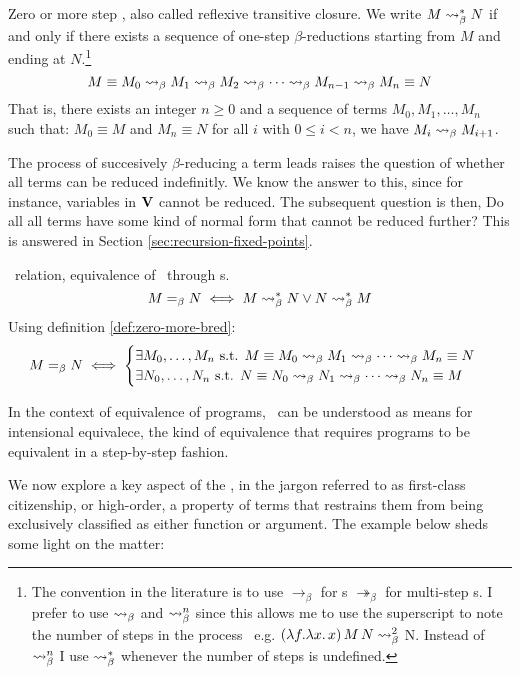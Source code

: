 \documentclass[12pt]{book}
\newcommand{\myref}[1]{\textcolor{refcolor}{\hyperref[#1]{\ref*{#1}}}}
\newcommand{\step}{\curly} %
\begin{document}
\begin{definition} Zero or more step \bred, also called reflexive transitive closure. We write $M \step^* N$ if and only if there exists a sequence of one-step $\beta$-reductions starting from $M$ and ending at $N$.\footnote{The convention in the literature is to use $\rightarrow_\beta$ for \bred s $\twoheadrightarrow_\beta$ for multi-step \bred s. I prefer to use $\mathrel{\leadsto}_\beta$ and $\mathrel{\leadsto}_\beta^n$ since this allows me to use the superscript to note the number of steps in the process \bred \ e.g. $ (\lambda f. \lambda x . \, x) \, M \, N \mathrel{\leadsto}_\beta^2 $ N. Instead of $\mathrel{\leadsto}_\beta^n$ I use $\mathrel{\leadsto}_\beta^*$ whenever the number of steps is undefined.}
  \label{def:zero-more-bred}
  \[
    M \equiv M_0 \step M_1 \step M_2 \step \cdots \step M_{n-1} \step M_n \equiv N
  \]
  That is, there exists an integer $n \geq 0$ and a sequence of terms $M_0, M_1, \dots, M_n$ such that: $ M_0 \equiv M $ and $ M_n \equiv N $ for all $ i $ with $ 0 \leq i < n $, we have $ M_i \step M_{i+1} $.
\end{definition}
The process of succesively $\beta$-reducing a term leads raises the question of whether all terms can be reduced indefinitly. We know the answer to this, since for instance, variables in $\mathbf{V}$ cannot be reduced. The subsequent question is then, Do all all terms have some kind of normal form that cannot be reduced further? This is answered in Section \myref{sec:recursion-fixed-points}.
\begin{definition} \bequiv \ relation, equivalence of \lterms \ through \bred s.
  \[
    M =_\beta N \iff M \step^* N \lor N \step^* M
  \]
 Using definition \ref{def:zero-more-bred}:
  \[
    M =_\beta N \iff
    \begin{cases}
      \exists M_0, \dots, M_n \text{ s.t. } M \equiv M_0 \mathrel{\leadsto}_\beta M_1 \mathrel{\leadsto}_\beta \cdots \mathrel{\leadsto}_\beta M_n \equiv N \\
      \exists N_0, \dots, N_n \text{ s.t. } N \equiv N_0 \mathrel{\leadsto}_\beta N_1 \mathrel{\leadsto}_\beta \cdots \mathrel{\leadsto}_\beta N_n \equiv M
    \end{cases}
  \]
\end{definition}
\begin{remark}
  In the context of equivalence of programs, \bequiv \ can be understood as means for intensional equivalece, the kind of equivalence that requires programs to be equivalent in a step-by-step fashion.
\end{remark}
We now explore a key aspect of the \lcalc, in the jargon referred to as first-class citizenship, or high-order, a property of terms that restrains them from being exclusively classified as either function or argument. The example below sheds some light on the matter:
\end{document}
